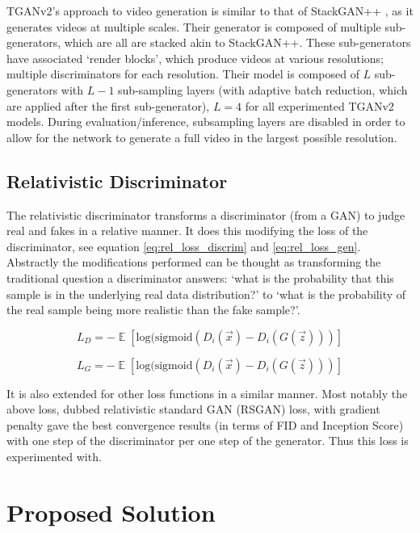 \documentclass{report}
\newcommand\blankpage{%
    \null
    \thispagestyle{empty}%
    \addtocounter{page}{-1}%
    \newpage}
\DeclareMathOperator{\E}{\mathbb{E}}
\theoremstyle{plain}
\theoremstyle{definition}
\theoremstyle{remark}
\numberwithin{equation}{section}
\numberwithin{figure}{section}
\newcommand{\<}{\langle}
\renewcommand{\>}{\rangle}
\begin{document}
TGANv2's approach to video generation is similar to that of StackGAN++ \cite{zhang_stackgan++:_2017}, as it generates videos at multiple scales. Their generator is composed of multiple sub-generators, which are all are stacked akin to StackGAN++. These sub-generators have associated `render blocks', which produce videos at various resolutions; multiple discriminators for each resolution. Their model is composed of $L$ sub-generators with $L - 1$ sub-sampling layers (with adaptive batch reduction, which are applied after the first sub-generator), $L = 4$ for all experimented TGANv2 models. During evaluation/inference, subsampling layers are disabled in order to allow for the network to generate a full video in the largest possible resolution.

\section{Relativistic Discriminator}

The relativistic discriminator \cite{jolicoeur-martineau_relativistic_2018} transforms a discriminator (from a GAN) to judge real and fakes in a relative manner. It does this modifying the loss of the discriminator, see equation \eqref{eq:rel_loss_discrim} and \eqref{eq:rel_loss_gen}. Abstractly the modifications performed can be thought as transforming the traditional question a discriminator answers: `what is the probability that this sample is in the underlying real data distribution?' to `what is the probability of the real sample being more realistic than the fake sample?'.

\begin{equation}
    \label{eq:rel_loss_discrim}
    L_{D} = -\E{[\text{log}(\text{sigmoid}({D_i(\vec{x}) - D_i(G(\vec{z}))})]}
\end{equation}

\begin{equation}
    \label{eq:rel_loss_gen}
    L_{G} = -\E{[\text{log}(\text{sigmoid}({D_i(\vec{x}) - D_i(G(\vec{z}))})]}
\end{equation}

It is also extended for other loss functions in a similar manner. Most notably the above loss, dubbed relativistic standard GAN (RSGAN) loss, with gradient penalty gave the best convergence results (in terms of FID and Inception Score) with one step of the discriminator per one step of the generator. Thus this loss is experimented with.

\blankpage
\chapter{Proposed Solution}
\end{document}
